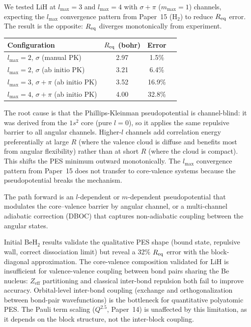 \documentclass[aps,pra,twocolumn,superscriptaddress,longbibliography,floatfix]{revtex4-2}
\begin{document}
We tested LiH at $l_{\max} = 3$ and $l_{\max} = 4$ with
$\sigma{+}\pi$ ($m_{\max} = 1$) channels, expecting the $l_{\max}$
convergence pattern from Paper~15 (H$_2$) to reduce $R_{\rm eq}$
error.  The result is the opposite: $R_{\rm eq}$ diverges
monotonically from experiment.

\begin{center}
\begin{tabular}{lccc}
\hline
Configuration & $R_{\rm eq}$ (bohr) & Error \\
\hline
$l_{\max}=2$, $\sigma$ (manual PK) & 2.97 & 1.5\% \\
$l_{\max}=2$, $\sigma$ (ab initio PK) & 3.21 & 6.4\% \\
$l_{\max}=3$, $\sigma{+}\pi$ (ab initio PK) & 3.52 & 16.9\% \\
$l_{\max}=4$, $\sigma{+}\pi$ (ab initio PK) & 4.00 & 32.8\% \\
\hline
\end{tabular}
\end{center}

The root cause is that the Phillips-Kleinman pseudopotential is
channel-blind: it was derived from the $1s^2$ core (pure $l=0$), so
it applies the same repulsive barrier to all angular channels.
Higher-$l$ channels add correlation energy preferentially at large
$R$ (where the valence cloud is diffuse and benefits most from
angular flexibility) rather than at short $R$ (where the cloud is
compact).  This shifts the PES minimum outward monotonically.
The $l_{\max}$ convergence pattern from Paper~15 does not transfer
to core-valence systems because the pseudopotential breaks the
mechanism.

The path forward is an $l$-dependent or $m$-dependent
pseudopotential that modulates the core--valence barrier by angular
channel, or a multi-channel adiabatic correction (DBOC) that
captures non-adiabatic coupling between the angular states.

Initial BeH$_2$ results validate the qualitative PES shape (bound state,
repulsive wall, correct dissociation limit) but reveal a 32\%
$R_{\rm eq}$ error with the block-diagonal approximation.  The
core-valence composition validated for LiH is insufficient for
valence-valence coupling between bond pairs sharing the Be nucleus:
$Z_{\mathrm{eff}}$ partitioning and classical inter-bond repulsion both
fail to improve accuracy.  Orbital-level inter-bond coupling (exchange
and orthogonalization between bond-pair wavefunctions) is the bottleneck
for quantitative polyatomic PES.  The Pauli term scaling
($Q^{2.5}$, Paper~14) is unaffected by this limitation, as
it depends on the block structure, not the inter-block coupling.
\end{document}
